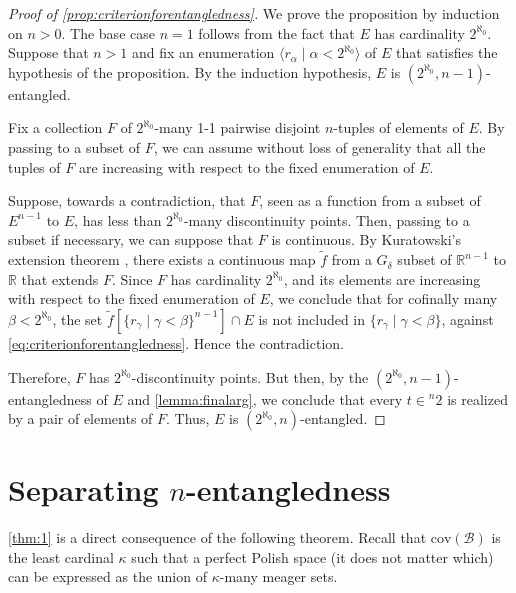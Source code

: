\documentclass[12pt]{amsart}
\theoremstyle{definition}
\theoremstyle{remark}
\begin{document}
\begin{proof}[Proof of \cref{prop:criterionforentangledness}]
We prove the proposition by induction on $n > 0$. The base case $n = 1$  follows from the fact that $E$ has cardinality $2^{\aleph_0}$. Suppose that $n > 1$ and fix an enumeration $\langle r_\alpha \mid \alpha < 2^{\aleph_0}\rangle$ of $E$ that satisfies the hypothesis of the proposition. By the induction hypothesis, $E$ is $(2^{\aleph_0}, n-1)$-entangled.

Fix a collection $F$ of $2^{\aleph_0}$-many 1-1 pairwise disjoint $n$-tuples of elements of $E$.
By passing to a subset of $F$, we can assume without loss of generality that all the tuples of $F$ are increasing with respect to the fixed enumeration of $E$.

Suppose, towards a contradiction, that $F$, seen as a function from a subset of $E^{n-1}$ to $E$, has less than $2^{\aleph_0}$-many discontinuity points. Then, passing to a subset if necessary, we can suppose that $F$ is continuous. By Kuratowski's extension theorem \cite[Theorem 3.8]{MR1321597}, there exists a continuous map $\tilde{f}$ from a $G_\delta$ subset of $\mathbb{R}^{n-1}$ to $\mathbb{R}$ that extends $F$. Since $F$ has cardinality $2^{\aleph_0}$, and its elements are increasing with respect to the fixed enumeration of $E$, we conclude that for cofinally many $\beta < 2^{\aleph_0}$, the set $\tilde{f}[\{r_\gamma \mid \gamma < \beta\}^{n-1}] \cap E $ is not included in $\{r_\gamma \mid \gamma < \beta\}$, against \eqref{eq:criterionforentangledness}. Hence the contradiction.

Therefore, $F$ has $2^{\aleph_0}$-discontinuity points. But then, by the $(2^{\aleph_0}, n-1)$-entangledness of $E$ and \cref{lemma:finalarg}, we conclude that every $t \in {}^{n} 2$ is realized by a pair of elements of $F$. Thus, $E$ is $(2^{\aleph_0}, n)$-entangled.
\end{proof}

\section{Separating $n$-entangledness}\label{sec:thm1}


\cref{thm:1} is a direct consequence of the following theorem. 
Recall that $\mathrm{cov}(\mathcal{B})$ is the least cardinal $\kappa$ such that a perfect Polish space (it does not matter which) can be expressed as the union of $\kappa$-many meager sets. 
\end{document}
